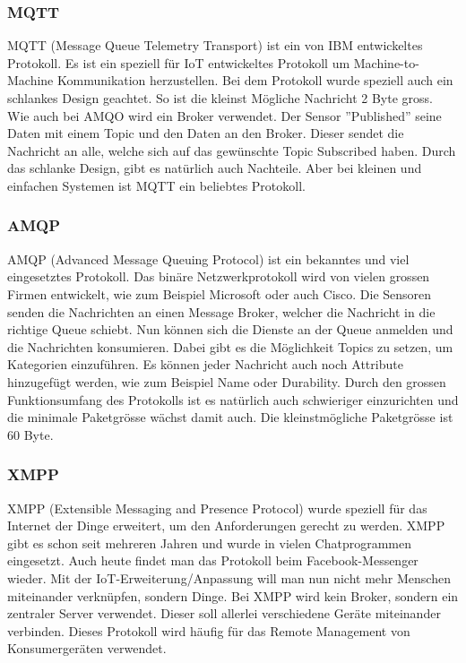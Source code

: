 \subsubsection{MQTT}
MQTT (Message Queue Telemetry Transport) ist ein von IBM entwickeltes Protokoll. Es ist ein speziell für IoT entwickeltes Protokoll um Machine-to-Machine Kommunikation herzustellen. Bei dem Protokoll wurde speziell auch ein schlankes Design geachtet. So ist die kleinst Mögliche Nachricht 2 Byte gross. Wie auch bei AMQO wird ein Broker verwendet. Der Sensor ''Published'' seine Daten mit einem Topic und den Daten an den Broker. Dieser sendet die Nachricht an alle, welche sich auf das gewünschte Topic Subscribed haben. Durch das schlanke Design, gibt es natürlich auch Nachteile. Aber bei kleinen und einfachen Systemen ist MQTT ein beliebtes Protokoll.
\subsubsection{AMQP}
AMQP (Advanced Message Queuing Protocol) ist ein bekanntes und viel eingesetztes Protokoll. Das binäre Netzwerkprotokoll wird von vielen grossen Firmen entwickelt, wie zum Beispiel Microsoft oder auch Cisco. Die Sensoren senden die Nachrichten an einen Message Broker, welcher die Nachricht in die richtige Queue schiebt. Nun können sich die Dienste an der Queue anmelden und die Nachrichten konsumieren. Dabei gibt es die Möglichkeit Topics zu setzen, um Kategorien einzuführen. Es können jeder Nachricht auch noch Attribute hinzugefügt werden, wie zum Beispiel Name oder Durability. Durch den grossen Funktionsumfang des Protokolls ist es natürlich auch schwieriger einzurichten und die minimale Paketgrösse wächst damit auch. Die kleinstmögliche Paketgrösse ist 60 Byte.
\subsubsection{XMPP}
XMPP (Extensible Messaging and Presence Protocol) wurde speziell für das Internet der Dinge erweitert, um den Anforderungen gerecht zu werden. XMPP gibt es schon seit mehreren Jahren und wurde in vielen Chatprogrammen eingesetzt. Auch heute findet man das Protokoll beim Facebook-Messenger wieder. Mit der IoT-Erweiterung/Anpassung will man nun nicht mehr Menschen miteinander verknüpfen, sondern Dinge. Bei XMPP wird kein Broker, sondern ein zentraler Server verwendet. Dieser soll allerlei verschiedene Geräte miteinander verbinden. Dieses Protokoll wird häufig für das Remote Management von Konsumergeräten verwendet.

























